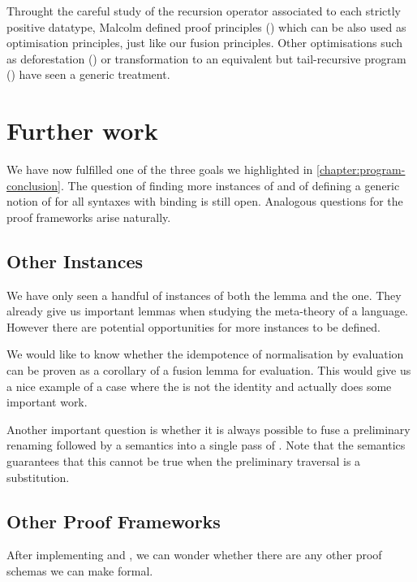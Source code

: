 Throught the careful study of the recursion operator associated to each strictly positive
datatype, Malcolm defined proof principles (\cite{DBLP:journals/scp/Malcolm90}) which can
be also used as optimisation principles, just like our fusion principles. Other optimisations
such as deforestation (\cite{wadler1990deforestation}) or transformation to an equivalent
but tail-recursive program (\cite{TomeCortinas:2018:AAM:3240719.3241787}) have seen a
generic treatment.


\section{Further work}

We have now fulfilled one of the three goals we highlighted in \cref{chapter:program-conclusion}.
The question of finding more instances of  and of defining a generic notion of
 for all syntaxes with binding is still open. Analogous questions for the proof
frameworks arise naturally.


\subsection{Other Instances}

We have only seen a handful of instances of both the  lemma and the 
one. They already give us important lemmas when studying the meta-theory of a language. However
there are potential opportunities for more instances to be defined.

We would like to know whether the idempotence of normalisation by evaluation can be proven as a
corollary of a fusion lemma for evaluation. This would give us a nice example of a case where
the  is not the identity and actually does some important work.

Another important question is whether it is always possible to fuse a preliminary renaming
followed by a semantics  into a single pass of . Note that the 
semantics guarantees that this cannot be true when the preliminary traversal is a substitution.

\subsection{Other Proof Frameworks}

After implementing  and , we can wonder whether there are any other
proof schemas we can make formal.

